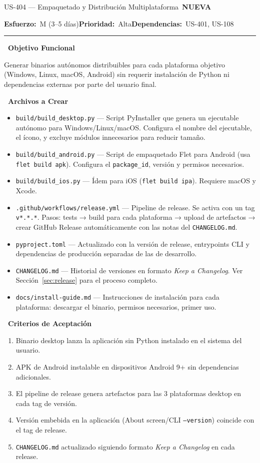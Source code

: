 \documentclass[11pt,a4paper]{article}
\newcommand{\fpath}[1]{\texttt{\small #1}}
\newcommand{\usfield}[2][\;]{%
  \par\vspace{5pt}%
  {\small\textbf{\textcolor{primary}{#2}}}\par\vspace{2pt}%
}
\newcommand{\usmeta}[3]{%
  \vspace{2pt}%
  {\small\textcolor{secondary}{%
    \textbf{Esfuerzo:}~#1\quad\textbf{Prioridad:}~#2\quad\textbf{Dependencias:}~#3%
  }}%
  \par\vspace{4pt}%
  \textcolor{bordergray}{\rule{\linewidth}{0.4pt}}\par\vspace{4pt}%
}
\newcommand{\tagnew}{\,\colorbox{tagnew}{\tiny\bfseries NUEVA}\,}
\begin{document}
\begin{uscard}{US-404 — Empaquetado y Distribución Multiplataforma \tagnew}

\usmeta{M (3–5 días)}{Alta}{US-401, US-108}

\usfield{\faAlignLeft\ Objetivo Funcional}
Generar binarios autónomos distribuibles para cada plataforma objetivo (Windows, Linux, macOS, Android) sin requerir instalación de Python ni dependencias externas por parte del usuario final.

\usfield{\faFolderOpen\ Archivos a Crear}
\begin{itemize}[nosep, leftmargin=1.6em]
  \item \fpath{build/build\_desktop.py} — Script PyInstaller que genera un ejecutable autónomo para Windows/Linux/macOS. Configura el nombre del ejecutable, el ícono, y excluye módulos innecesarios para reducir tamaño.
  \item \fpath{build/build\_android.py} — Script de empaquetado Flet para Android (usa \fpath{flet build apk}). Configura el \fpath{package\_id}, versión y permisos necesarios.
  \item \fpath{build/build\_ios.py} — Ídem para iOS (\fpath{flet build ipa}). Requiere macOS y Xcode.
  \item \fpath{.github/workflows/release.yml} — Pipeline de release. Se activa con un tag \fpath{v*.*.*}. Pasos: tests → build para cada plataforma → upload de artefactos → crear GitHub Release automáticamente con las notas del \fpath{CHANGELOG.md}.
  \item \fpath{pyproject.toml} — Actualizado con la versión de release, entrypoints CLI y dependencias de producción separadas de las de desarrollo.
  \item \fpath{CHANGELOG.md} — Historial de versiones en formato \textit{Keep a Changelog}. Ver Sección~\ref{sec:release} para el proceso completo.
  \item \fpath{docs/install-guide.md} — Instrucciones de instalación para cada plataforma: descargar el binario, permisos necesarios, primer uso.
\end{itemize}

\usfield{\faCheckCircle\ Criterios de Aceptación}
\begin{enumerate}[label=\textcolor{accent}{\textbf{AC\arabic*.}}, nosep, leftmargin=2.2em]
  \item Binario desktop lanza la aplicación sin Python instalado en el sistema del usuario.
  \item APK de Android instalable en dispositivos Android 9+ sin dependencias adicionales.
  \item El pipeline de release genera artefactos para las 3 plataformas desktop en cada tag de versión.
  \item Versión embebida en la aplicación (About screen/CLI \fpath{--version}) coincide con el tag de release.
  \item \fpath{CHANGELOG.md} actualizado siguiendo formato \textit{Keep a Changelog} en cada release.
\end{enumerate}


\end{uscard}
\end{document}
